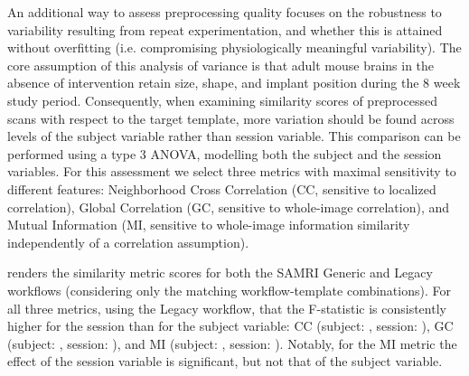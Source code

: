 An additional way to assess preprocessing quality focuses on the robustness to variability resulting from repeat experimentation, and whether this is attained without overfitting (i.e. compromising physiologically meaningful variability).
The core assumption of this analysis of variance is that adult mouse brains in the absence of intervention retain size, shape, and implant position during the 8 week study period.
Consequently, when examining similarity scores of preprocessed scans with respect to the target template, more variation should be found across levels of the subject variable rather than session variable.
This comparison can be performed using a type 3 ANOVA, modelling both the subject and the session variables.
For this assessment we select three metrics with maximal sensitivity to different features:
Neighborhood Cross Correlation (CC, sensitive to localized correlation),
Global Correlation (GC, sensitive to whole-image correlation),
and Mutual Information (MI, sensitive to whole-image information similarity independently of a correlation assumption).

 renders the similarity metric scores for both the SAMRI Generic and Legacy workflows (considering only the matching workflow-template combinations).
For all three metrics, using the Legacy workflow, that the F-statistic is consistently higher for the session than for the subject variable:
CC (subject: , session: ),
GC (subject: , session: ),
and MI (subject: , session: ).
Notably, for the MI metric the effect of the session variable is significant, but not that of the subject variable. 


